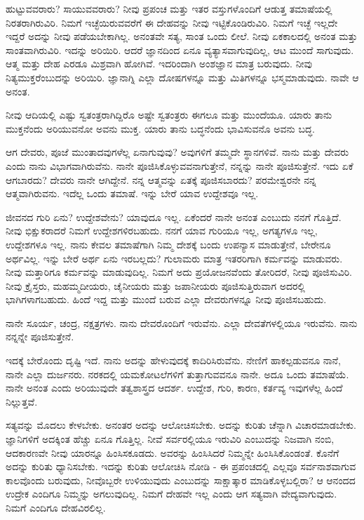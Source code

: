 ಹುಟ್ಟುವವರಾರು? ಸಾಯುವವರಾರು? ನೀವು ಪ್ರಪಂಚ ಮತ್ತು ಇತರ ವಸ್ತುಗಳೊಂದಿಗೆ ಆಡುತ್ತ ತಮಾಷೆಯಲ್ಲಿ ನಿರತರಾಗಿರುವಿರಿ. ನಿಮಗೆ ಇಚ್ಛೆಯಿರುವವರೆಗೆ ಈ ದೇಹವನ್ನು ನೀವು ಇಟ್ಟಿಕೊಂಡಿರುವಿರಿ. ನಿಮಗೆ ಇಚ್ಛೆ ಇಲ್ಲದೇ ಇದ್ದರೆ ಅದನ್ನು ನೀವು ಪಡೆಯಬೇಕಾಗಿಲ್ಲ. ಅನಂತವೇ ಸತ್ಯ, ಸಾಂತ ಒಂದು ಲೀಲೆ. ನೀವು ಏಕಕಾಲದಲ್ಲಿ ಅನಂತ ಮತ್ತು ಸಾಂತವಾಗಿರುವಿರಿ. ಇದನ್ನು ಅರಿಯಿರಿ. ಆದರೆ ಜ್ಞಾನದಿಂದ ಏನೂ ವ್ಯತ್ಯಾಸವಾಗುವುದಿಲ್ಲ, ಆಟ ಮುಂದೆ ಸಾಗುವುದು. ಆತ್ಮ ಮತ್ತು ದೇಹ ಎರಡೂ ಮಿಶ್ರವಾಗಿ ಹೋಗಿವೆ. ಇದರಿಂದಾಗಿ ಅಂಶಜ್ಞಾನ ಮಾತ್ರ ಬರುವುದು. ನೀವು ನಿತ್ಯಮುಕ್ತರೆಂಬುದನ್ನು ಅರಿಯಿರಿ. ಜ್ಞಾನಾಗ್ನಿ ಎಲ್ಲಾ ದೋಷಗಳನ್ನೂ ಮತ್ತು ಮಿತಿಗಳನ್ನೂ ಭಸ್ಮಮಾಡುವುದು. ನಾವೇ ಆ ಅನಂತ.

ನೀವು ಆದಿಯಲ್ಲಿ ಎಷ್ಟು ಸ್ವತಂತ್ರರಾಗಿದ್ದಿರೊ ಅಷ್ಟೇ ಸ್ವತಂತ್ರರು ಈಗಲೂ ಮತ್ತು ಮುಂದೆಯೂ. ಯಾರು ತಾನು ಮುಕ್ತನೆಂದು ಅರಿಯುವನೋ ಅವನು ಮುಕ್ತ. ಯಾರು ತಾನು ಬದ್ಧನೆಂದು ಭಾವಿಸುವನೊ ಅವನು ಬದ್ಧ.

ಆಗ ದೇವರು, ಪೂಜೆ ಮುಂತಾದವುಗಳೆಲ್ಲ ಏನಾಗುವುವು? ಅವುಗಳಿಗೆ ತಮ್ಮದೇ ಸ್ಥಾನಗಳಿವೆ. ನಾನು ಮತ್ತು ದೇವರು ಎಂದು ನಾನು ವಿಭಾಗವಾಗಿರುವೆನು. ನಾನೇ ಪೂಜಿಸಿಕೊಳ್ಳುವವನಾಗುತ್ತೇನೆ, ನನ್ನನ್ನು ನಾನೇ ಪೂಜಿಸುತ್ತೇನೆ. ಇದು ಏಕೆ ಆಗಬಾರದು? ದೇವರು ನಾನೇ ಆಗಿದ್ದೇನೆ. ನನ್ನ ಆತ್ಮವನ್ನು ಏತಕ್ಕೆ ಪೂಜಿಸಬಾರದು? ಪರಮೇಶ್ವರನೇ ನನ್ನ ಆತ್ಮವಾಗಿರುವನು. ಇದೆಲ್ಲ ಒಂದು ತಮಾಷೆ. ಇನ್ನು ಬೇರೆ ಯಾವ ಉದ್ದೇಶವೂ ಇಲ್ಲ.

ಜೀವನದ ಗುರಿ ಏನು? ಉದ್ದೇಶವೇನು? ಯಾವುದೂ ಇಲ್ಲ. ಏಕೆಂದರೆ ನಾನೇ ಅನಂತ ಎಂಬುದು ನನಗೆ ಗೊತ್ತಿದೆ. ನೀವು ಭಿಕ್ಷುಕರಾದರೆ ನಿಮಗೆ ಉದ್ದೇಶಗಳಿರಬಹುದು. ನನಗೆ ಯಾವ ಗುರಿಯೂ ಇಲ್ಲ, ಅಗತ್ಯಗಳೂ ಇಲ್ಲ, ಉದ್ದೇಶಗಳೂ ಇಲ್ಲ. ನಾನು ಕೇವಲ ತಮಾಷೆಗಾಗಿ ನಿಮ್ಮ ದೇಶಕ್ಕೆ ಬಂದು ಉಪನ್ಯಾಸ ಮಾಡುತ್ತೇನೆ, ಬೇರೇನೂ ಅರ್ಥವಿಲ್ಲ. ಇನ್ನು ಬೇರೆ ಅರ್ಥ ಏನು ಇರಬಲ್ಲದು? ಗುಲಾಮರು ಮಾತ್ರ ಇತರರಿಗಾಗಿ ಕರ್ಮವನ್ನು ಮಾಡುವರು. ನೀವು ಮತ್ತಾರಿಗೂ ಕರ್ಮವನ್ನು ಮಾಡುವುದಿಲ್ಲ. ನಿಮಗೆ ಅದು ಪ್ರಯೋಜನವೆಂದು ತೋರಿದರೆ, ನೀವು ಪೂಜಿಸುವಿರಿ. ನೀವು ಕ್ರೈಸ್ತರು, ಮಹಮ್ಮದೀಯರು, ಚೈನೀಯರು ಮತ್ತು ಜಪಾನೀಯರು ಪೂಜಿಸುತ್ತಿರುವಾಗ ಅದರಲ್ಲಿ ಭಾಗಿಗಳಾಗಬಹುದು. ಹಿಂದೆ ಇದ್ದ ಮತ್ತು ಮುಂದೆ ಬರುವ ಎಲ್ಲಾ ದೇವರುಗಳನ್ನೂ ನೀವು ಪೂಜಿಸಬಹುದು.

ನಾನೇ ಸೂರ್ಯ, ಚಂದ್ರ, ನಕ್ಷತ್ರಗಳು. ನಾನು ದೇವರೊಂದಿಗೆ ಇರುವೆನು. ಎಲ್ಲಾ ದೇವತೆಗಳಲ್ಲಿಯೂ ಇರುವೆನು. ನಾನು ನನ್ನನ್ನೇ ಪೂಜಿಸುತ್ತೇನೆ.

ಇದಕ್ಕೆ ಬೇರೊಂದು ದೃಷ್ಟಿ ಇದೆ. ನಾನು ಅದನ್ನು ಹೇಳುವುದಕ್ಕೆ ಕಾದಿರಿಸಿರುವೆನು. ನೇಣಿಗೆ ಹಾಕಲ್ಪಡುವನೂ ನಾನೆ, ನಾನೇ ಎಲ್ಲಾ ದುರ್ಜನರು. ನರಕದಲ್ಲಿ ಯಮಕೋಟಲೆಗಳಿಗೆ ತುತ್ತಾಗುವವನೂ ನಾನೇ. ಅದೂ ಒಂದು ತಮಾಷೆಯೆ. ನಾನೇ ಅನಂತ ಎಂದು ಅರಿಯುವುದೇ ತತ್ವಶಾಸ್ತ್ರದ ಆದರ್ಶ. ಉದ್ದೇಶ, ಗುರಿ, ಕಾರಣ, ಕರ್ತವ್ಯ ಇವುಗಳೆಲ್ಲ ಹಿಂದೆ ನಿಲ್ಲುತ್ತವೆ.

ಸತ್ಯವನ್ನು ಮೊದಲು ಕೇಳಬೇಕು. ಅನಂತರ ಅದನ್ನು ಆಲೋಚಿಸಬೇಕು. ಅದನ್ನು ಕುರಿತು ಚೆನ್ನಾಗಿ ವಿಚಾರಮಾಡಬೇಕು. ಜ್ಞಾನಿಗಳಿಗೆ ಅದಕ್ಕಿಂತ ಹೆಚ್ಚು ಏನೂ ಗೊತ್ತಿಲ್ಲ. ನೀವೆ ಸರ್ವರಲ್ಲಿಯೂ ಇರುವಿರಿ ಎಂಬುದನ್ನು ನಿಜವಾಗಿ ನಂಬಿ, ಆದಕಾರಣವೇ ನೀವು ಯಾರನ್ನೂ ಹಿಂಸಿಸಕೂಡದು. ಅವರನ್ನು ಹಿಂಸಿಸಿದರೆ ನಿಮ್ಮನ್ನೇ ಹಿಂಸಿಸಿಕೊಂಡಂತೆ. ಕೊನೆಗೆ ಅದನ್ನು ಕುರಿತು ಧ್ಯಾನಿಸಬೇಕು. ಇದನ್ನು ಕುರಿತು ಆಲೋಚಿಸಿ ನೋಡಿ - ಈ ಪ್ರಪಂಚದಲ್ಲಿ ಎಲ್ಲವೂ ಸರ್ವನಾಶವಾಗುವ ಕಾಲವೊಂದು ಬರುವುದು, ನೀವೊಬ್ಬರೇ ಉಳಿಯುವುದು ಎಂಬುದನ್ನು ಸಾಕ್ಷಾತ್ಕಾರ ಮಾಡಿಕೊಳ್ಳಬಲ್ಲಿರಾ? ಆ ಆನಂದದ ಉದ್ರೇಕ ಎಂದಿಗೂ ನಿಮ್ಮನ್ನು ಅಗಲುವುದಿಲ್ಲ. ನಿಮಗೆ ದೇಹವೇ ಇಲ್ಲ ಎಂದು ಆಗ ಸತ್ಯವಾಗಿ ವೇದ್ಯವಾಗುವುದು. ನಿಮಗೆ ಎಂದಿಗೂ ದೇಹವಿರಲಿಲ್ಲ.

